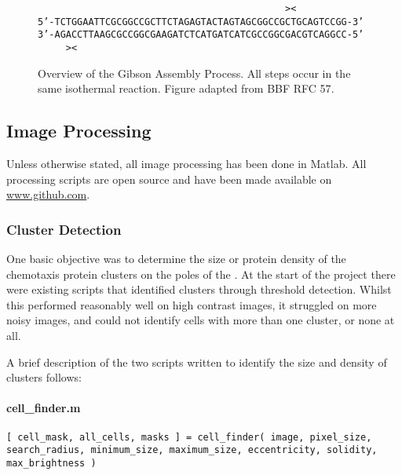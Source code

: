 \documentclass[../main.tex]{subfiles}
\begin{document}
\begin{figure}
{{\texttt{\color{black}\ \ \ \ \ \ \ \ \ \ \ \ \ \ \ \ \ \ \ \ \ \ \ \ \ \ \ \ \ \ \ \ \ \ \ \ \ \ \ \ \ \ \ \ ><}
\\
\texttt{\color{DarkGreen}5'-TCTGGAATTCGCGGCCGCTTCTAGAG\color{DarkSalmon}TACTAGTAGCGGCCGC\color{DarkMagenta}TGCAGTC\color{DarkBlue}CGG-3'}
\\
\texttt{\color{DarkGreen}3'-AGA\color{DarkMagenta}CCTTAAG\color{DarkSalmon}CGCCGGCGAAGATCTC\color{DarkBlue}ATGATCATCGCCGGCGACGTCAGGCC-5'}
\\
\texttt{\color{black}\ \ \ \ \ ><\ \ \ }
}
\label{fig:gibson:5}
}
\caption{Overview of the Gibson Assembly Process. All steps occur in the same isothermal reaction. Figure adapted from BBF RFC 57\cite{rfc57}.}
\label{fig:gibson}
\end{figure}


\subsection{Image Processing}
Unless otherwise stated, all image processing has been done in Matlab. All processing scripts are open source and have been made available on \url{www.github.com}.

\subsubsection{Cluster Detection}
One basic objective was to determine the size or protein density of the chemotaxis protein clusters on the poles of the \ecoli. At the start of the project there were existing scripts that identified clusters through threshold detection. Whilst this performed reasonably well on high contrast images, it struggled on more noisy images, and could not identify cells with more than one cluster, or none at all.

A brief description of the two scripts written to identify the size and density of clusters follows:

\paragraph{cell\_finder.m}


\texttt{[ cell\_mask, all\_cells, masks ] = cell\_finder( image, pixel\_size, search\_radius, minimum\_size, maximum\_size, eccentricity, solidity, max\_brightness ) }
\end{document}
